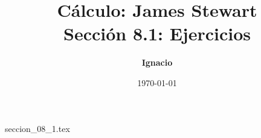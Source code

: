 \documentclass[11pt,spanish,oneside]{report}
\title{\textbf{Cálculo: James Stewart} \\ \Large Sección 8.1: Ejercicios}
\author{\textbf{Ignacio}}
\date{\today}
\begin{document}
\maketitle

{seccion_08_1.tex}
\end{document}
